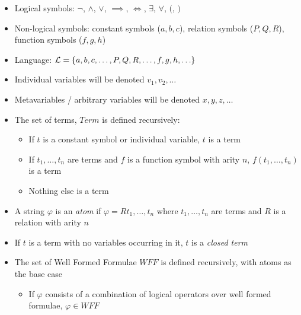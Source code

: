 \begin{itemize}
	
	\item Logical symbols: $ \lnot $, $ \land $, $ \lor $, $ \implies $, $ \iff $, $ \exists $, $ \forall $, $ ( $, $ ) $
	
	\item Non-logical symbols: constant symbols ($ a, b, c $), relation symbols ($ P, Q, R $), function symbols ($ f, g, h $)
	
	\item Language: $ \Lang = \set{a, b, c, \dots, P, Q, R, \dots, f, g, h, \dots}$
	
	\item Individual variables will be denoted $ v_1, v_2, \dots $
	
	\item Metavariables / arbitrary variables will be denoted $ x, y, z, \dots $
	
	\item The set of terms, $ Term $ is defined recursively:
	
	\begin{itemize}
		
		\item If $ t $ is a constant symbol or individual variable, $ t $ is a term
		
		\item If $ t_1, \dots, t_n $ are terms and $ f $ is a function symbol with arity $ n $, $ f(t_1, \dots, t_n) $ is a term
		
		\item Nothing else is a term
		
	\end{itemize}
	
	\item A string $ \varphi $ is an \textit{atom} if $ \varphi = Rt_1, \dots, t_n $ where $ t_1, \dots, t_n $ are terms and $ R $ is a relation with arity $ n $
	
	\item If $ t $ is a term with no variables occurring in it, $ t $ is a \textit{closed term}
	
	\item The set of Well Formed Formulae $ WFF $ is defined recursively, with atoms as the base case
	
	\begin{itemize}
		\item If $ \varphi $ consists of a combination of logical operators over well formed formulae, $ \varphi \in WFF $
	\end{itemize}
	

\end{itemize}
